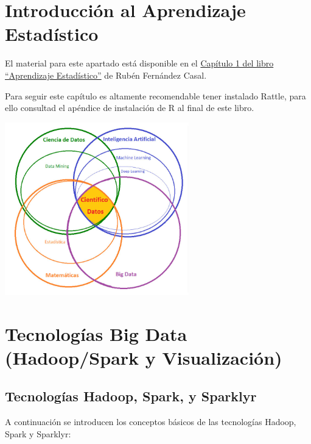 \documentclass[
]{book}
\begin{document}
\hypertarget{introducciuxf3n-al-aprendizaje-estaduxedstico}{%
\section{Introducción al Aprendizaje Estadístico}\label{introducciuxf3n-al-aprendizaje-estaduxedstico}}

El material para este apartado está disponible en el
\href{https://rubenfcasal.github.io/aprendizaje_estadistico/intro-AE.html}{Capítulo 1 del libro ``Aprendizaje Estadístico''} de Rubén Fernández Casal.

Para seguir este capítulo es altamente recomendable tener instalado Rattle, para ello consultad el apéndice de instalación de R al final de este libro.

\includegraphics[width=0.6\textwidth,height=\textheight]{images/T3-CientificoDatos.png}

\hypertarget{tecnologuxedas-big-data-hadoopspark-y-visualizaciuxf3n}{%
\section{Tecnologías Big Data (Hadoop/Spark y Visualización)}\label{tecnologuxedas-big-data-hadoopspark-y-visualizaciuxf3n}}

\hypertarget{tecnologuxedas-hadoop-spark-y-sparklyr}{%
\subsection{Tecnologías Hadoop, Spark, y Sparklyr}\label{tecnologuxedas-hadoop-spark-y-sparklyr}}

A continuación se introducen los conceptos básicos de las tecnologías Hadoop, Spark y Sparklyr:
\end{document}
